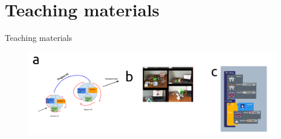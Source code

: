 \section{Teaching materials}


{
\begin{frame}{Teaching materials}
      \begin{figure}
        \centering
        \includegraphics[width=1.0\textwidth]{./figures/teaching-materials/versions/drawing-v01.png}
      \end{figure}
\end{frame}
}
